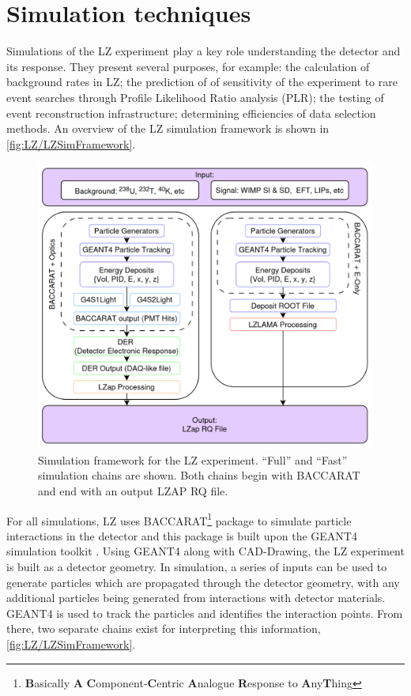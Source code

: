 \section{Simulation techniques}\label{sec:LZ/Simulations}
Simulations of the LZ experiment play a key role understanding the detector and its response. They present several purposes, for example: the calculation of background rates in LZ; the prediction of of sensitivity of the experiment to rare event searches through Profile Likelihood Ratio analysis (PLR); the testing of event reconstruction infrastructure; determining efficiencies of data selection methods. An overview of the LZ simulation framework is shown in \autoref{fig:LZ/LZSimFramework}.
\begin{figure}[!ht]
    \centering
    \includegraphics[width=\linewidth]{figures/LZ/LZSimFramework.png}
    \caption{Simulation framework for the LZ experiment. ``Full'' and ``Fast'' simulation chains are shown. Both chains begin with BACCARAT and end with an output LZAP RQ file.}
    \label{fig:LZ/LZSimFramework}
\end{figure}
For all simulations, LZ uses BACCARAT\footnote{\textbf{B}asically \textbf{A} \textbf{C}omponent-\textbf{C}entric \textbf{A}nalogue \textbf{R}esponse to \textbf{A}ny\textbf{T}hing}\cite{LZ_SIMS} package to simulate particle interactions in the detector and this package is built upon the GEANT4 simulation toolkit \cite{GEANT4:2002zbu}. Using GEANT4 along with CAD-Drawing, the LZ experiment is built as a detector geometry. In simulation, a series of inputs can be used to generate particles which are propagated through the detector geometry, with any additional particles being generated from interactions with detector materials. GEANT4 is used to track the particles and identifies the interaction points. From there, two separate chains exist for interpreting this information, \autoref{fig:LZ/LZSimFramework}.

